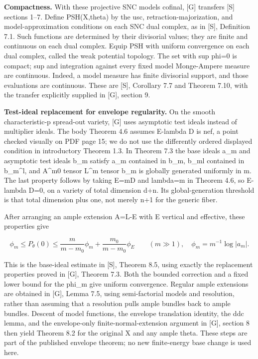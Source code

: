 \documentclass[11pt]{article}
\begin{document}
\textbf{Compactness.} With these projective SNC models cofinal, [G] transfers [S] sections 1--7. Define PSH(X,theta) by the usc, retraction-majorization, and model-approximation conditions on each SNC dual complex, as in [S], Definition 7.1. Such functions are determined by their divisorial values; they are finite and continuous on each dual complex. Equip PSH with uniform convergence on each dual complex, called the weak potential topology. The set with sup phi=0 is compact; sup and integration against every fixed model Monge-Ampere measure are continuous. Indeed, a model measure has finite divisorial support, and those evaluations are continuous. These are [S], Corollary 7.7 and Theorem 7.10, with the transfer explicitly supplied in [G], section 9.

\textbf{Test-ideal replacement for envelope regularity.} On the smooth characteristic-p spread-out variety, [G] uses asymptotic test ideals instead of multiplier ideals. The body Theorem 4.6 assumes E-lambda D is nef, a point checked visually on PDF page 15; we do not use the differently ordered displayed condition in introductory Theorem 1.3. In Theorem 7.3 the base ideals a\_m and asymptotic test ideals b\_m satisfy a\_m contained in b\_m, b\_ml contained in b\_m\textasciicircum{}l, and A\textasciicircum{}m0 tensor L\textasciicircum{}m tensor b\_m is globally generated uniformly in m. The last property follows by taking E=mD and lambda=m in Theorem 4.6, so E-lambda D=0, on a variety of total dimension d+n. Its global-generation threshold is that total dimension plus one, not merely n+1 for the generic fiber.

After arranging an ample extension A=L-E with E vertical and effective, these properties give

\[
\phi_m\leq P_\theta(0)\leq\frac{m}{m-m_0}\phi_m+
\frac{m_0}{m-m_0}\phi_E\qquad(m\gg1),
\quad \phi_m=m^{-1}\log|a_m|.
\]

This is the base-ideal estimate in [S], Theorem 8.5, using exactly the replacement properties proved in [G], Theorem 7.3. Both the bounded correction and a fixed lower bound for the phi\_m give uniform convergence. Regular ample extensions are obtained in [G], Lemma 7.5, using semi-factorial models and resolution, rather than assuming that a resolution pulls ample bundles back to ample bundles. Descent of model functions, the envelope translation identity, the ddc lemma, and the envelope-only finite-normal-extension argument in [G], section 8 then yield Theorem 8.2 for the original X and any ample theta. These steps are part of the published envelope theorem; no new finite-energy base change is used here.
\end{document}
